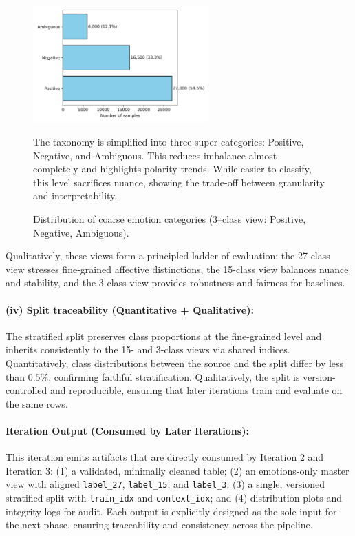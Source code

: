 \begin{figure}[!htbp] 
\centering
\includegraphics[width=0.6\textwidth]{Images/dist_3.png}
\caption{Distribution of coarse emotion categories (3--class view: Positive, Negative, Ambiguous).}
\label{fig:dist-3}
\vspace{0.3em}
{\small
The taxonomy is simplified into three super-categories: Positive, Negative, and Ambiguous. This reduces imbalance almost completely and highlights polarity trends. While easier to classify, this level sacrifices nuance, showing the trade-off between granularity and interpretability.
}
\end{figure}


Qualitatively, these views form a principled ladder of evaluation: the 27-class view stresses fine-grained affective distinctions, the 15-class view balances nuance and stability, and the 3-class view provides robustness and fairness for baselines.

\paragraph{(iv) Split traceability (Quantitative + Qualitative):}
The stratified split preserves class proportions at the fine-grained level and inherits consistently to the 15- and 3-class views via shared indices. Quantitatively, class distributions between the source and the split differ by less than $0.5\%$, confirming faithful stratification. Qualitatively, the split is version-controlled and reproducible, ensuring that later iterations train and evaluate on the same rows.

\paragraph{Iteration Output (Consumed by Later Iterations):}
This iteration emits artifacts that are directly consumed by Iteration 2 and Iteration 3: (1) a validated, minimally cleaned table; (2) an emotions-only master view with aligned \texttt{label\_27}, \texttt{label\_15}, and \texttt{label\_3}; (3) a single, versioned stratified split with \texttt{train\_idx} and \texttt{context\_idx}; and (4) distribution plots and integrity logs for audit. Each output is explicitly designed as the sole input for the next phase, ensuring traceability and consistency across the pipeline.

